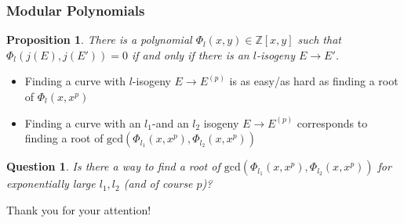 \documentclass{beamer}
\newcommand{\Z}{\mathbb{Z}}
\newtheorem{proposition}{Proposition}
\newtheorem{question}{Question}
\begin{document}
\begin{frame}
    \frametitle{Modular Polynomials}

    \begin{proposition}
        There is a polynomial $\Phi_l(x, y) \in \Z[x, y]$ such that $\Phi_l(j(E), j(E')) = 0$ if and only if there is an $l$-isogeny $E \to E'$.
    \end{proposition}

    \begin{itemize}
        \item Finding a curve with $l$-isogeny $E \to E^{(p)}$ is as easy/as hard as finding a root of $\Phi_l(x, x^p)$
        \item Finding a curve with an $l_1$-and an $l_2$ isogeny $E \to E^{(p)}$ corresponds to finding a root of $\mathrm{gcd}(\Phi_{l_1}(x, x^p), \Phi_{l_2}(x, x^p))$
    \end{itemize}

    \begin{question}
        Is there a way to find a root of $\mathrm{gcd}(\Phi_{l_1}(x, x^p), \Phi_{l_2}(x, x^p))$ for exponentially large $l_1, l_2$ (and of course $p$)?
    \end{question}
\end{frame}

\begin{frame}
    \begin{center}
        \Huge
        Thank you for your attention!
    \end{center}
    \printbibliography
\end{frame}
\end{document}
